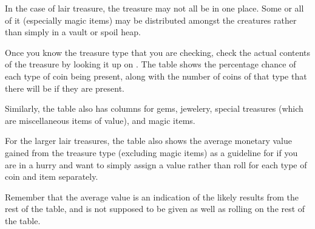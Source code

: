 \begin{multicols*}{2}
In the case of lair treasure, the treasure may not all be in one place. Some or all of it (especially magic items) may be distributed amongst the creatures rather than simply in a vault or spoil heap.

Once you know the treasure type that you are checking, check the actual contents of the treasure by looking it up on . The table shows the percentage chance of each type of coin being present, along with the number of coins of that type that there will be if they are present.

Similarly, the table also has columns for gems, jewelery, special treasures (which are miscellaneous items of value), and magic items.

For the larger lair treasures, the table also shows the average monetary value gained from the treasure type (excluding magic items) as a guideline for if you are in a hurry and want to simply assign a value rather than roll for each type of coin and item separately.

Remember that the average value is an indication of the likely results from the rest of the table, and is not supposed to be given as well as rolling on the rest of the table.

\end{multicols*}
